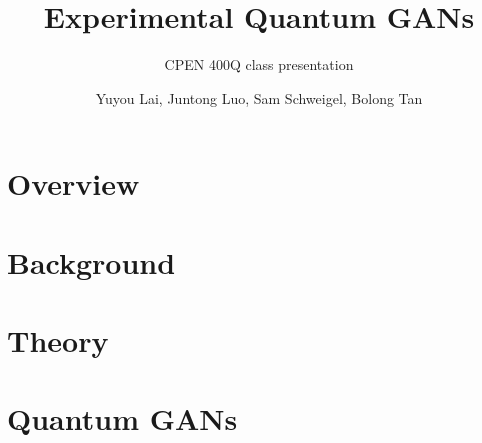 \documentclass{beamer}
\title{Experimental Quantum GANs}
\subtitle{CPEN 400Q class presentation}
\author{Yuyou Lai, Juntong Luo, Sam Schweigel, Bolong Tan}
\date{}
\begin{document}
\frame{\titlepage}

\makeatletter
{}%
\makeatother

\section{Overview}




\section{Background}


\section{Theory}


\section{Quantum GANs}

\end{document}
